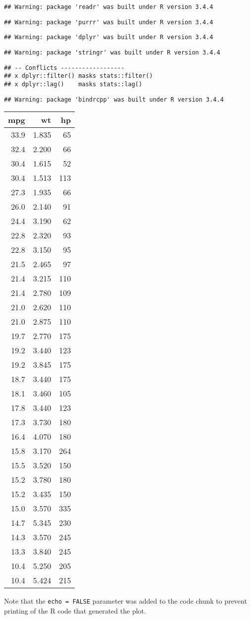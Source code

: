 \documentclass[]{article}
\begin{document}
\begin{verbatim}
## Warning: package 'readr' was built under R version 3.4.4
\end{verbatim}

\begin{verbatim}
## Warning: package 'purrr' was built under R version 3.4.4
\end{verbatim}

\begin{verbatim}
## Warning: package 'dplyr' was built under R version 3.4.4
\end{verbatim}

\begin{verbatim}
## Warning: package 'stringr' was built under R version 3.4.4
\end{verbatim}

\begin{verbatim}
## -- Conflicts ------------------
## x dplyr::filter() masks stats::filter()
## x dplyr::lag()    masks stats::lag()
\end{verbatim}

\begin{verbatim}
## Warning: package 'bindrcpp' was built under R version 3.4.4
\end{verbatim}

\begin{longtable}[]{@{}rrr@{}}
\toprule
mpg & wt & hp\tabularnewline
\midrule
\endhead
33.9 & 1.835 & 65\tabularnewline
32.4 & 2.200 & 66\tabularnewline
30.4 & 1.615 & 52\tabularnewline
30.4 & 1.513 & 113\tabularnewline
27.3 & 1.935 & 66\tabularnewline
26.0 & 2.140 & 91\tabularnewline
24.4 & 3.190 & 62\tabularnewline
22.8 & 2.320 & 93\tabularnewline
22.8 & 3.150 & 95\tabularnewline
21.5 & 2.465 & 97\tabularnewline
21.4 & 3.215 & 110\tabularnewline
21.4 & 2.780 & 109\tabularnewline
21.0 & 2.620 & 110\tabularnewline
21.0 & 2.875 & 110\tabularnewline
19.7 & 2.770 & 175\tabularnewline
19.2 & 3.440 & 123\tabularnewline
19.2 & 3.845 & 175\tabularnewline
18.7 & 3.440 & 175\tabularnewline
18.1 & 3.460 & 105\tabularnewline
17.8 & 3.440 & 123\tabularnewline
17.3 & 3.730 & 180\tabularnewline
16.4 & 4.070 & 180\tabularnewline
15.8 & 3.170 & 264\tabularnewline
15.5 & 3.520 & 150\tabularnewline
15.2 & 3.780 & 180\tabularnewline
15.2 & 3.435 & 150\tabularnewline
15.0 & 3.570 & 335\tabularnewline
14.7 & 5.345 & 230\tabularnewline
14.3 & 3.570 & 245\tabularnewline
13.3 & 3.840 & 245\tabularnewline
10.4 & 5.250 & 205\tabularnewline
10.4 & 5.424 & 215\tabularnewline
\bottomrule
\end{longtable}

Note that the \texttt{echo\ =\ FALSE} parameter was added to the code
chunk to prevent printing of the R code that generated the plot.
\end{document}
